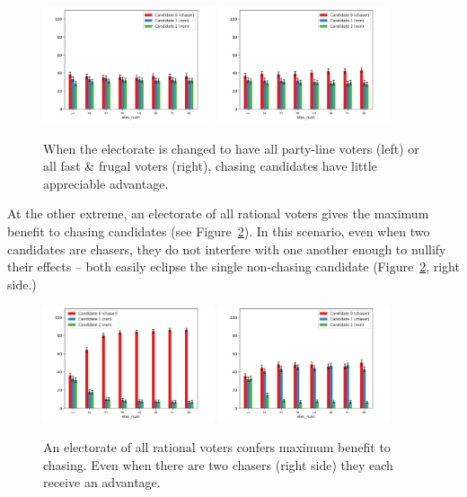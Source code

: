 \begin{figure}[ht]
\centering
\includegraphics[width=0.45\textwidth]{assets/all_party_1_chaser_no_benefit.png}
\includegraphics[width=0.45\textwidth]{assets/all_ff_chasers_no_benefit.png}
\caption{When the electorate is changed to have all party-line voters (left) or
all fast \& frugal voters (right), chasing candidates have little appreciable
advantage.}
\label{chasing_vs_distro}
\end{figure}

At the other extreme, an electorate of all rational voters gives the maximum
benefit to chasing candidates (see Figure~\ref{all_rat_chasers_benefit}). In
this scenario, even when two candidates are chasers, they do not interfere with
one another enough to nullify their effects -- both easily eclipse the single
non-chasing candidate (Figure~\ref{all_rat_chasers_benefit}, right side.)

\begin{figure}[ht]
\centering
\includegraphics[width=0.45\textwidth]{assets/all_rat_one_chaser_even_bigger_benefit.png}
\includegraphics[width=0.45\textwidth]{assets/all_rat_two_chasers_even_bigger_benefit.png}
\caption{An electorate of all rational voters confers maximum benefit to
chasing. Even when there are two chasers (right side) they each receive an
advantage.}
\label{all_rat_chasers_benefit}
\end{figure}


